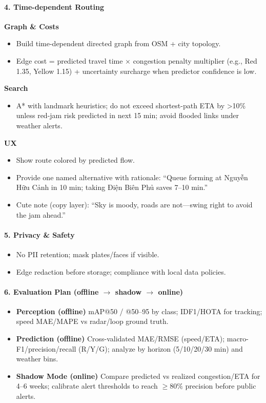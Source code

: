 \paragraph{4. Time-dependent Routing}
	\textbf{Graph \& Costs}
\begin{itemize}
  \item Build time-dependent directed graph from OSM + city topology.
  \item Edge cost = predicted travel time $\times$ congestion penalty multiplier (e.g., Red 1.35, Yellow 1.15) + uncertainty surcharge when predictor confidence is low.
\end{itemize}
	\textbf{Search}
\begin{itemize}
  \item A* with landmark heuristics; do not exceed shortest-path ETA by >10\% unless red-jam risk predicted in next 15 min; avoid flooded links under weather alerts.
\end{itemize}
	\textbf{UX}
\begin{itemize}
  \item Show route colored by predicted flow.
  \item Provide one named alternative with rationale: ``Queue forming at Nguyễn Hữu Cảnh in 10 min; taking Điện Biên Phủ saves 7--10 min.''
  \item Cute note (copy layer): ``Sky is moody, roads are not---swing right to avoid the jam ahead.''
\end{itemize}

\paragraph{5. Privacy \& Safety}
\begin{itemize}
  \item No PII retention; mask plates/faces if visible.
  \item Edge redaction before storage; compliance with local data policies.
\end{itemize}

\paragraph{6. Evaluation Plan (offline $\rightarrow$ shadow $\rightarrow$ online)}
\begin{itemize}
	\item \textbf{Perception (offline)} mAP@50 / @50--95 by class; IDF1/HOTA for tracking; speed MAE/MAPE vs radar/loop ground truth.
	\item \textbf{Prediction (offline)} Cross-validated MAE/RMSE (speed/ETA); macro-F1/precision/recall (R/Y/G); analyze by horizon (5/10/20/30 min) and weather bins.
	\item \textbf{Shadow Mode (online)} Compare predicted vs realized congestion/ETA for 4--6 weeks; calibrate alert thresholds to reach $\ge 80\%$ precision before public alerts.
\end{itemize}

